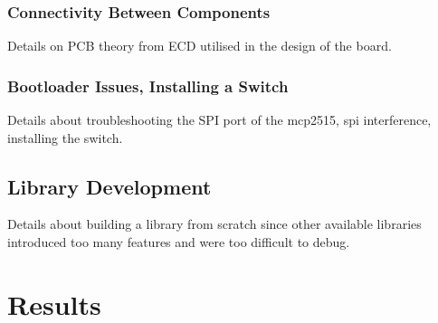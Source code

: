 \subsubsection{Connectivity Between Components}
Details on PCB theory from ECD utilised in the design of the board.

\subsubsection{Bootloader Issues, Installing a Switch}
Details about troubleshooting the SPI port of the mcp2515, spi interference, installing the switch.

\subsection{Library Development}
Details about building a library from scratch since other available libraries introduced too many features and were too difficult to debug.

\section{Results}


